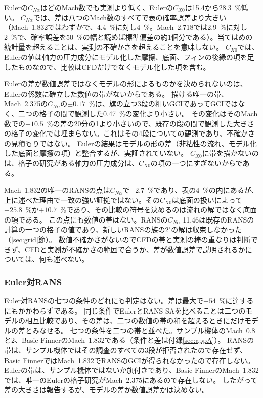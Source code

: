 \documentclass[twocolumn]{labreport}
\newcommand{\CNa}{C_{N\alpha}}
\newcommand{\CXzero}{C_{X0}}
\begin{document}
Eulerの$\CNa$はどのMach数でも実測より低く、Eulerの$\CXzero$は15.4から28.3~\%低い。
$\CNa$では、差は八つのMach数のすべてで表の確率誤差より大きい（Mach~1.832ではわずかで、4.4~\%に対し4~\%。Mach~2.718では2.9~\%に対し2~\%で、確率誤差を50~\%の幅と読めば標準偏差の約1個分である）。当てはめの統計量を超えることは、実測の不確かさを超えることを意味しない。
$\CXzero$では、Eulerの値は軸力の圧力成分にモデル化した摩擦、底面、フィンの後縁の項を足したものなので、比較はCFDだけでなくモデル化した項を含む。

Eulerの差が数値誤差ではなくモデルの形によるものかを決められないのは、Eulerの係数に確立した数値の帯がないからである。
描ける唯一の帯、Mach~2.375の$\CNa$の$\pm0.17$~\%は、旗の立つ3段の粗いGCIであってGCIではなく、二つの格子の間で観測した0.47~\%の変化より小さい。
その変化はそのMach数での$-10.5$~\%の差の20分の1より小さいので、既存の段の間で観測した大きさの格子の変化では埋まらない。これはその4段についての観測であり、不確かさの見積もりではない。
Eulerの結果はモデルの形の差（非粘性の流れ、モデル化した底面と摩擦の項）と整合するが、実証されていない。
$\CXzero$に帯を描かないのは、格子の研究がある軸力の圧力成分は、$\CXzero$の項の一つにすぎないからである。

Mach~1.832の唯一のRANSの点は$\CNa$で$-2.7$~\%であり、表の4~\%の内にあるが、上に述べた理由で一致の強い証拠ではない。その$\CXzero$は底面の扱いによって$-25.8$~\%か$+10.7$~\%であり、その比較の符号を決めるのは流れの解ではなく底面の項である。
この点にも数値の帯はない。RANSの$\CNa$ 11.46は既存のRANSの計算の一つの格子の値であり、新しいRANSの族の$2^\circ$の解は収束しなかった（\ref{sec:grid}節）。
数値不確かさがないのでCFDの帯と実測の棒の重なりは判断できず、CFDと実測が不確かさの範囲で合うか、差が数値誤差で説明されるかについては、何も述べない。

\subsubsection{Euler対RANS}
\label{sec:eulerrans}

Euler対RANSの七つの条件のどれにも判定はない。差は最大で$+54$~\%に達するにもかかわらずである。
同じ条件でEulerとRANS-SAを比べることは二つのモデルの相互比較であり、その差は、二つの数値の帯の和を超えるときにだけモデルの差とみなせる。
七つの条件を二つの帯と並べた。サンプル機体のMach~0.8と2、Basic FinnerのMach~1.832である（条件と差は付録\ref{sec:appA}）。
RANSの帯は、サンプル機体ではその調査のすべての3段が拒否されたので存在せず、Basic FinnerではMach~1.832でRANSのGCIが得られなかったので存在しない。Eulerの帯は、サンプル機体ではないか旗付きであり、Basic FinnerのMach~1.832では、唯一のEulerの格子研究がMach~2.375にあるので存在しない。
したがって差の大きさは報告するが、モデルの差か数値誤差かは決めない。
\end{document}
